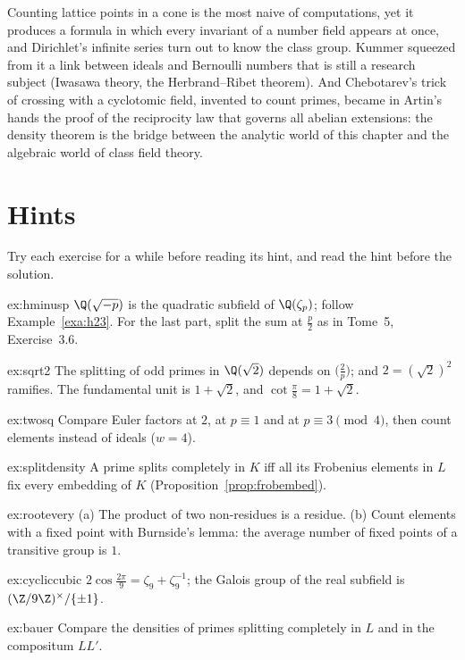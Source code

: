 \begin{beauty}
Counting lattice points in a cone is the most naive of computations, yet it produces a formula in which every invariant of a number field
appears at once, and Dirichlet's infinite series turn out to know the class group. Kummer squeezed from it a link between ideals and Bernoulli
numbers that is still a research subject (Iwasawa theory, the Herbrand--Ribet theorem). And Chebotarev's trick of crossing with a cyclotomic field,
invented to count primes, became in Artin's hands the proof of the reciprocity law that governs all abelian extensions: the density theorem is
the bridge between the analytic world of this chapter and the algebraic world of class field theory.
\end{beauty}

\section{Hints}

Try each exercise for a while before reading its hint, and read the hint before the solution.

\begin{hint}{ex:hminusp}
$\Q(\sqrt{-p})$ is the quadratic subfield of $\Q(\zeta_p)$; follow Example~\ref{exa:h23}. For the last part, split the sum at $\frac p2$ as in
Tome~5, Exercise~3.6.
\end{hint}
\begin{hint}{ex:sqrt2}
The splitting of odd primes in $\Q(\sqrt2)$ depends on $\bigl(\frac2p\bigr)$; and $2=(\sqrt2)^2$ ramifies. The fundamental unit is $1+\sqrt2$, and
$\cot\frac\pi8=1+\sqrt2$.
\end{hint}
\begin{hint}{ex:twosq}
Compare Euler factors at $2$, at $p\equiv1$ and at $p\equiv3\pmod4$, then count elements instead of ideals ($w=4$).
\end{hint}
\begin{hint}{ex:splitdensity}
A prime splits completely in $K$ iff all its Frobenius elements in $L$ fix every embedding of $K$ (Proposition~\ref{prop:frobembed}).
\end{hint}
\begin{hint}{ex:rootevery}
(a) The product of two non-residues is a residue. (b) Count elements with a fixed point with Burnside's lemma: the average number of fixed
points of a transitive group is $1$.
\end{hint}
\begin{hint}{ex:cycliccubic}
$2\cos\frac{2\pi}9=\zeta_9+\zeta_9^{-1}$; the Galois group of the real subfield is $(\Z/9\Z)^\times/\{\pm1\}$.
\end{hint}
\begin{hint}{ex:bauer}
Compare the densities of primes splitting completely in $L$ and in the compositum $LL'$.
\end{hint}

